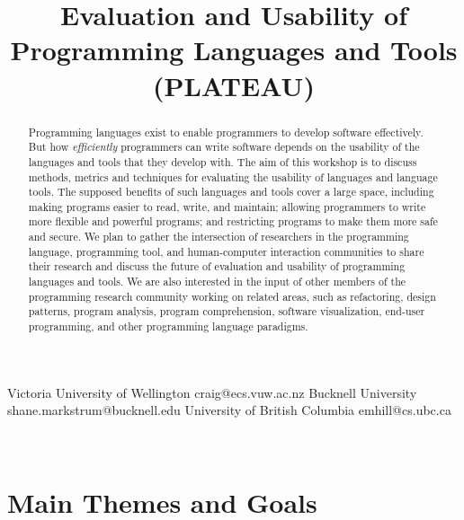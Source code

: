 \documentclass{sigplanconf}
\begin{document}
\title{Evaluation and Usability of Programming Languages and Tools (PLATEAU)}

           {Victoria University of Wellington}
           {craig@ecs.vuw.ac.nz}
           {Bucknell University}
           {shane.markstrum@bucknell.edu}
           {University of British Columbia}
           {emhill@cs.ubc.ca}

\date{}

\maketitle
\begin{abstract}

  Programming languages exist to enable programmers to develop
  software effectively.  But how \emph{efficiently} programmers can
  write software depends on the usability of the languages and tools
  that they develop with.  The aim of this workshop is to discuss
  methods, metrics and techniques for evaluating the usability of
  languages and language tools.  The supposed benefits of such
  languages and tools cover a large space, including making programs
  easier to read, write, and maintain; allowing programmers to write
  more flexible and powerful programs; and restricting programs to
  make them more safe and secure. We plan to gather the intersection
  of researchers in the programming language, programming tool, and
  human-computer interaction communities to share their research and
  discuss the future of evaluation and usability of programming
  languages and tools. We are also interested in the input of other
  members of the programming research community working on related
  areas, such as refactoring, design patterns, program analysis,
  program comprehension, software visualization, end-user programming,
  and other programming language paradigms.

\end{abstract}

\\




\section{Main Themes and Goals}
\end{document}
